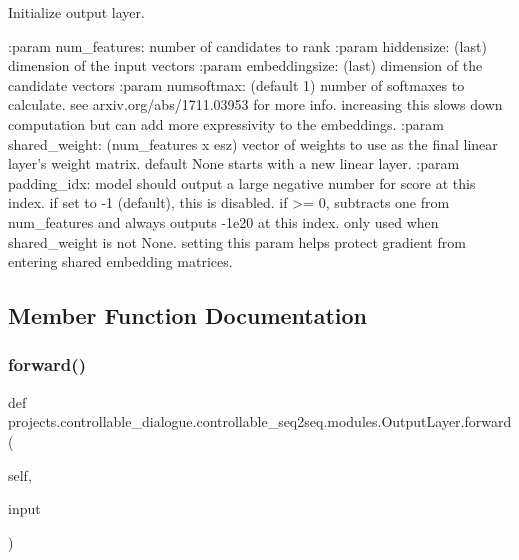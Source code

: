 \begin{DoxyVerb}Initialize output layer.

:param num_features:  number of candidates to rank
:param hiddensize:    (last) dimension of the input vectors
:param embeddingsize: (last) dimension of the candidate vectors
:param numsoftmax:   (default 1) number of softmaxes to calculate.
              see arxiv.org/abs/1711.03953 for more info.
              increasing this slows down computation but can
              add more expressivity to the embeddings.
:param shared_weight: (num_features x esz) vector of weights to use as
              the final linear layer's weight matrix. default
              None starts with a new linear layer.
:param padding_idx:   model should output a large negative number for
              score at this index. if set to -1 (default),
              this is disabled. if >= 0, subtracts one from
              num_features and always outputs -1e20 at this
              index. only used when shared_weight is not None.
              setting this param helps protect gradient from
              entering shared embedding matrices.
\end{DoxyVerb}
 

\subsection{Member Function Documentation}
\mbox{\label{classprojects_1_1controllable__dialogue_1_1controllable__seq2seq_1_1modules_1_1OutputLayer_a38fcafa8abd1574ef85240804ef2393a}} 
\subsubsection{\texorpdfstring{forward()}{forward()}}
{\footnotesize\ttfamily def projects.\+controllable\+\_\+dialogue.\+controllable\+\_\+seq2seq.\+modules.\+Output\+Layer.\+forward (\begin{DoxyParamCaption}\item[{}]{self,  }\item[{}]{input }\end{DoxyParamCaption})}

